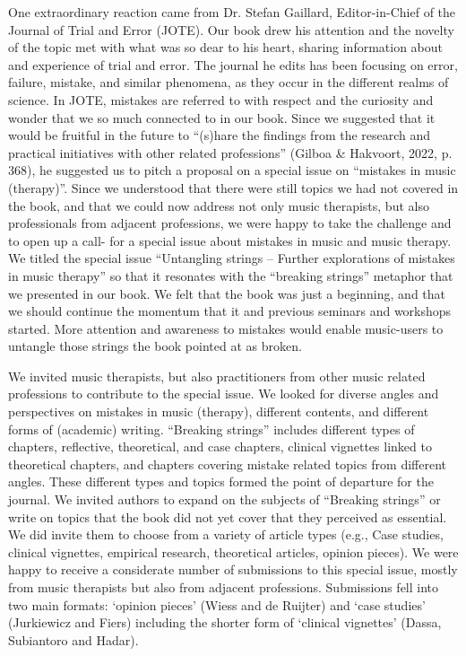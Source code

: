 \documentclass[authordate, empirical, issue]{jote-new-article}
\begin{document}
One extraordinary reaction came from Dr. Stefan Gaillard, Editor-in-Chief of the Journal of Trial and Error (JOTE). Our book drew his attention and the novelty of the topic met with what was so dear to his heart, sharing information about and experience of trial and error. The journal he edits has been focusing on error, failure, mistake, and similar phenomena, as they occur in the different realms of science. In JOTE, mistakes are referred to with respect and the curiosity and wonder that we so much connected to in our book. Since we suggested that it would be fruitful in the future to “(s)hare the findings from the research and practical initiatives with other related professions” (Gilboa \& Hakvoort, 2022, p. 368), he suggested us to pitch a proposal on a special issue on “mistakes in music (therapy)”. Since we understood that there were still topics we had not covered in the book, and that we could now address not only music therapists, but also professionals from adjacent professions, we were happy to take the challenge and to open up a call- for a special issue about mistakes in music and music therapy. We titled the special issue “Untangling strings -- Further explorations of mistakes in music therapy” so that it resonates with the “breaking strings” metaphor that we presented in our book. We felt that the book was just a beginning, and that we should continue the momentum that it and previous seminars and workshops started. More attention and awareness to mistakes would enable music-users to untangle those strings the book pointed at as broken.



We invited music therapists, but also practitioners from other music related professions to contribute to the special issue. We looked for diverse angles and perspectives on mistakes in music (therapy), different contents, and different forms of (academic) writing. “Breaking strings” includes different types of chapters, reflective, theoretical, and case chapters, clinical vignettes linked to theoretical chapters, and chapters covering mistake related topics from different angles. These different types and topics formed the point of departure for the journal. We invited authors to expand on the subjects of “Breaking strings” or write on topics that the book did not yet cover that they perceived as essential. We did invite them to choose from a variety of article types (e.g., Case studies, clinical vignettes, empirical research, theoretical articles, opinion pieces). We were happy to receive a considerate number of submissions to this special issue, mostly from music therapists but also from adjacent professions. Submissions fell into two main formats: ‘opinion pieces' (Wiess and de Ruijter) and ‘case studies' (Jurkiewicz and Fiers) including the shorter form of ‘clinical vignettes' (Dassa, Subiantoro and Hadar).
\end{document}
